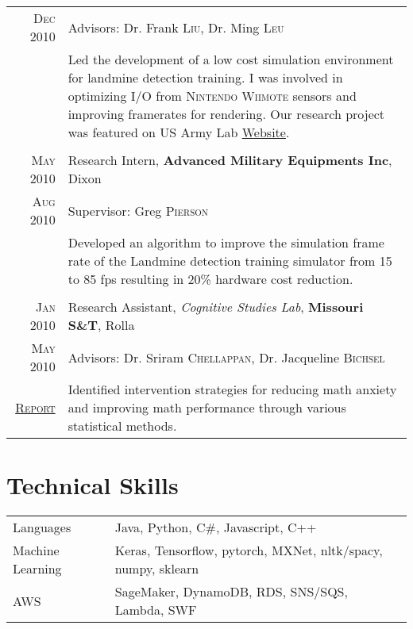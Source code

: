 \documentclass[a4paper,11pt]{article}
\begin{document}
\begin{longtable}{r|p{12.5cm}}
 \textsc{Dec 2010} & \small Advisors: Dr. Frank \textsc{Liu}, Dr. Ming \textsc{Leu} \\
 & \footnotesize{ \begin{minipage}[t]{12.5cm} 
	Led the development of a low cost simulation environment for landmine detection training. I was involved in optimizing I/O from \textsc{Nintendo Wiimote} sensors and improving framerates for rendering. Our research project was featured on US Army Lab \href{http://www.arl.army.mil/www/default.cfm?page=640}{Website}.
 \end{minipage}}
 \\
 \multicolumn{2}{c}{}
 \\
 \textsc{May 2010} & Research Intern, \normalsize \textbf{Advanced Military Equipments Inc}, Dixon \\
 \textsc{Aug 2010} & \small Supervisor: Greg \textsc{Pierson} \\
 & \footnotesize{ \begin{minipage}[t]{12.5cm} Developed an algorithm to improve the simulation frame rate of the Landmine detection training simulator from 15 to 85 fps resulting in 20\% hardware cost reduction.
 \end{minipage}}
 \\
 \multicolumn{2}{c}{}
 \\
 \textsc{Jan 2010} & Research Assistant, \emph{Cognitive Studies Lab}, \normalsize \textbf{Missouri S\&T}, Rolla \\
 \textsc{May 2010} & \small Advisors: Dr. Sriram \textsc{Chellappan}, Dr. Jacqueline \textsc{Bichsel} \\
 \textsc{\href{https://github.com/raghakot/papers/blob/master/math_anxiety.pdf}{Report}} & \footnotesize{\begin{minipage}[t]{12.5cm} Identified intervention strategies for reducing math anxiety and improving math performance through various statistical methods.
 \end{minipage}}\\
\end{longtable}

\section{Technical Skills}
\begin{longtable}{lp{11cm}}
 Languages & Java, Python, C\#, Javascript, C++ \\
 Machine Learning & Keras, Tensorflow, pytorch, MXNet, nltk/spacy, numpy, sklearn \\
 AWS & SageMaker, DynamoDB, RDS, SNS/SQS, Lambda, SWF \\
\end{longtable}
\end{document}
